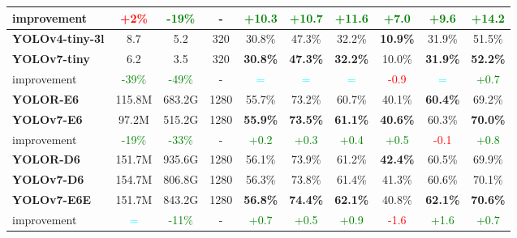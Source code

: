 \documentclass[10pt,twocolumn,letterpaper]{article}
\begin{document}
\begin{table*}[t]
\begin{threeparttable}[t]
\begin{tabular}{lccccccccc}
					improvement & \textcolor{red}{+2\%} & \textcolor{green}{-19\%} & - & \textcolor{green}{+10.3} & \textcolor{green}{+10.7} & \textcolor{green}{+11.6} & \textcolor{green}{+7.0} & \textcolor{green}{+9.6} & \textcolor{green}{+14.2} \\
\midrule
					\textbf{YOLOv4-tiny-3l \cite{wang2021scaled}} & 8.7 & 5.2 & 320 & 30.8\% & 47.3\% & 32.2\% & \textbf{10.9\%} & 31.9\% & 51.5\% \\
					\textbf{YOLOv7-tiny} & 6.2 & 3.5 & 320 & \textbf{30.8\%} & \textbf{47.3\%} & \textbf{32.2\%} & 10.0\% & \textbf{31.9\%} & \textbf{52.2\%} \\
					improvement & \textcolor{green}{-39\%} & \textcolor{green}{-49\%} & - & \textcolor{cyan}{=} & \textcolor{cyan}{=} & \textcolor{cyan}{=} & \textcolor{red}{-0.9} & \textcolor{cyan}{=} & \textcolor{green}{+0.7} \\
\midrule
					\textbf{YOLOR-E6 \cite{wang2021you}} & 115.8M & 683.2G & 1280 & 55.7\% & 73.2\% & 60.7\% & 40.1\% & \textbf{60.4\%} & 69.2\% \\
					\textbf{YOLOv7-E6} & 97.2M & 515.2G & 1280 & \textbf{55.9\%} & \textbf{73.5\%} & \textbf{61.1\%} & \textbf{40.6\%} & 60.3\% & \textbf{70.0\%} \\
					improvement & \textcolor{green}{-19\%} & \textcolor{green}{-33\%} & - & \textcolor{green}{+0.2} & \textcolor{green}{+0.3} & \textcolor{green}{+0.4} & \textcolor{green}{+0.5} & \textcolor{red}{-0.1} & \textcolor{green}{+0.8} \\
					\midrule
					\textbf{YOLOR-D6 \cite{wang2021you}} & 151.7M & 935.6G & 1280 & 56.1\% & 73.9\% & 61.2\% & \textbf{42.4\%} & 60.5\% & 69.9\% \\
					\textbf{YOLOv7-D6} & 154.7M & 806.8G & 1280 & 56.3\% & 73.8\% & 61.4\% & 41.3\% & 60.6\% & 70.1\% \\
					\textbf{YOLOv7-E6E} & 151.7M & 843.2G & 1280 & \textbf{56.8\%} & \textbf{74.4\%} & \textbf{62.1\%} & 40.8\% & \textbf{62.1\%} & \textbf{70.6\%} \\
					improvement & \textcolor{cyan}{=} & \textcolor{green}{-11\%} & - & \textcolor{green}{+0.7} & \textcolor{green}{+0.5} & \textcolor{green}{+0.9} & \textcolor{red}{-1.6} & \textcolor{green}{+1.6} & \textcolor{green}{+0.7} \\
					\bottomrule
				\end{tabular}
\end{threeparttable}
		\vspace{-2mm}
		\end{table*}
		
\end{document}
